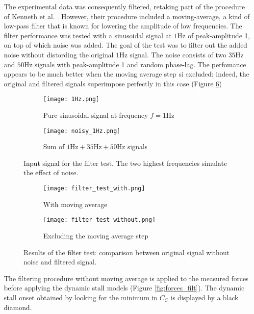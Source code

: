 The experimental data was consequently filtered, retaking part of the procedure of Kenneth et al. \cite{kenneth_experiments_2011}. However, their procedure included a moving-average, a kind of low-pass filter that is known for lowering the amplitude of low frequencies. 
The filter performance was tested with a sinusoidal signal at $1 \si{\hertz}$ of peak-amplitude 1, on top of which noise was added. The goal of the test was to filter out the added noise without distording the original $1 \si{\hertz}$ signal. 
The noise consists of two $35 \si{\hertz}$ and $50 \si{\hertz}$ signals with peak-amplitude 1 and random phase-lag. The perfomance appears to be much better when the moving average step si excluded: indeed, the original and filtered signals superimpose perfectly in this case (Figure \ref{fig:filter_test_without})

\begin{figure}[h]
	\begin{subfigure}{.5\textwidth}
		\texttt{[image: 1Hz.png]}
		\caption{Pure sinusoidal signal at frequency $f=1 \si{\hertz}$}
		\label{fig:1Hz}
	\end{subfigure}%
	\begin{subfigure}{.5\textwidth}
		\texttt{[image: noisy\_1Hz.png]}
		\caption{Sum of $1\si{\hertz} + 35\si{\hertz} + 50\si{\hertz}$ signals}
		\label{fig:noisy_1Hz}
	\end{subfigure}
	\caption{Input signal for the filter test. The two highest frequencies simulate the effect of noise.}
\end{figure}

\begin{figure}[h]
	\begin{subfigure}{.5\textwidth}
		\texttt{[image: filter\_test\_with.png]}
		\caption{With moving average}
		\label{fig:filter_test_with}
	\end{subfigure}%
	\begin{subfigure}{.5\textwidth}
		\texttt{[image: filter\_test\_without.png]}
		\caption{Excluding the moving average step}
		\label{fig:filter_test_without}
	\end{subfigure}
	\caption{Results of the filter test: comparison between original signal without noise and filtered signal.}
\end{figure}

The filtering procedure without moving average is applied to the measured forces before applying the dynamic stall models (Figure \ref{fig:forces_filt}). The dynamic stall onset obtained by looking for the minimum in $C_C$ is displayed by a black diamond. 

